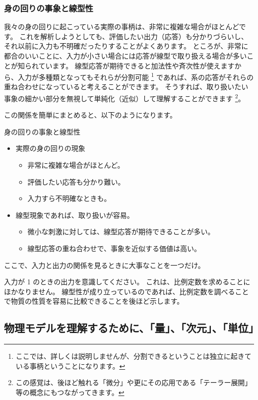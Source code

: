 \documentclass[uplatex,dvipdfmx,a4paper,11pt]{jsreport}
\begin{document}
\subsubsection{身の回りの事象と線型性}
我々の身の回りに起こっている実際の事柄は、非常に複雑な場合がほとんどです。
これを解析しようとしても、評価したい出力（応答）も分かりづらいし、それ以前に入力も不明確だったりすることがよくあります。
ところが、非常に都合のいいことに、入力が小さい場合には応答が線型で取り扱える場合が多いことが知られています。
線型応答が期待できると加法性や斉次性が使えますから、入力が多種類となってもそれらが分割可能
\footnote{
	ここでは、詳しくは説明しませんが、分割できるということは独立に起きている事柄ということになります。
}
であれば、系の応答がそれらの重ね合わせになっていると考えることができます。
そうすれば、取り扱いたい事象の細かい部分を無視して単純化（近似）して理解することができます
\footnote{
	この感覚は、後ほど触れる「微分」や更にその応用である「テーラー展開」等の概念にもつながってきます。
}。

この関係を簡単にまとめると、以下のようになります。
\large
\begin{itembox}[l]{身の回りの事象と線型性}
	\begin{itemize}
		\item 実際の身の回りの現象
		\begin{itemize}
			\item 非常に複雑な場合がほとんど。
			\item 評価したい応答も分かり難い。
			\item 入力すら不明確なときも。
		\end{itemize}
		\item 線型現象であれば、取り扱いが容易。
		\begin{itemize}
			\item 微小な刺激に対しては、線型応答が期待できることが多い。
			\item 線型応答の重ね合わせで、事象を近似する価値は高い。
		\end{itemize}
	\end{itemize}	
\end{itembox}
\normalsize
ここで、入力と出力の関係を見るときに大事なことを一つだけ。

入力が 1 のときの出力を意識してください。
これは、比例定数を求めることにほかなりません。
線型性が成り立っているのであれば、比例定数を調べることで物質の性質を容易に比較できることを後ほど示します。

\subsection{物理モデルを理解するために、「量」、「次元」、「単位」}
\end{document}

